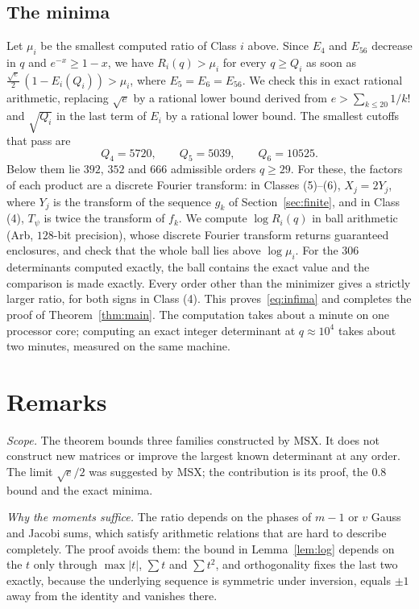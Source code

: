 \documentclass[11pt]{article}
\newcommand{\abs}[1]{\lvert#1\rvert}
\newcommand{\Lstar}{\tfrac{\sqrt e}{2}}
\begin{document}
\subsection{The minima}\label{sec:infima}
Let $\mu_i$ be the smallest computed ratio of Class $i$ above. Since $E_4$
and $E_{56}$ decrease in $q$ and $e^{-x}\ge1-x$, we have $R_i(q)>\mu_i$ for
every $q\ge Q_i$ as soon as $\Lstar\,(1-E_i(Q_i))>\mu_i$, where
$E_5=E_6=E_{56}$. We check this in exact rational arithmetic, replacing
$\sqrt e$ by a rational lower bound derived from $e>\sum_{k\le20}1/k!$ and
$\sqrt{Q_i}$ in the last term of $E_i$ by a rational lower bound. The
smallest cutoffs that pass are
\[
 Q_4=5720,\qquad Q_5=5039,\qquad Q_6=10525 .
\]
Below them lie $392$, $352$ and $666$ admissible orders $q\ge29$. For
these, the factors of each product are a discrete Fourier transform: in
Classes (5)--(6), $X_j=2Y_j$, where $Y_j$ is the transform of the
sequence $g_k$ of Section~\ref{sec:finite}, and in Class (4), $T_\psi$ is
twice the transform of $f_k$. We compute $\log R_i(q)$ in ball arithmetic
(Arb, $128$-bit precision), whose discrete Fourier transform returns
guaranteed enclosures, and check that the whole ball lies above
$\log\mu_i$. For the 306 determinants computed exactly, the ball
contains the exact value and the comparison is made exactly. Every order
other than the minimizer gives a strictly larger ratio, for both signs in
Class (4). This proves~\eqref{eq:infima} and completes the proof of
Theorem~\ref{thm:main}. The computation takes about a minute on one
processor core; computing an exact integer determinant at $q\approx10^4$
takes about two minutes, measured on the same machine.

\section{Remarks}\label{sec:remarks}

\emph{Scope.} The theorem bounds three families constructed by MSX. It does
not construct new matrices or improve the largest known determinant at any
order. The limit $\sqrt e/2$ was suggested by MSX; the contribution is its
proof, the $0.8$ bound and the exact minima.

\emph{Why the moments suffice.} The ratio depends on the phases of
$m-1$ or $v$ Gauss and Jacobi sums, which satisfy arithmetic relations that
are hard to describe completely. The proof avoids them: the bound in
Lemma~\ref{lem:log} depends on the $t$ only through $\max\abs t$, $\sum t$
and $\sum t^2$, and orthogonality fixes the last two exactly, because the
underlying sequence is symmetric under inversion, equals $\pm1$ away from
the identity and vanishes there.
\end{document}

